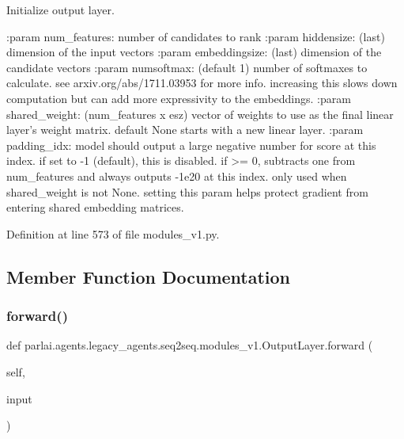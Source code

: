 \begin{DoxyVerb}Initialize output layer.

:param num_features:  number of candidates to rank
:param hiddensize:    (last) dimension of the input vectors
:param embeddingsize: (last) dimension of the candidate vectors
:param numsoftmax:   (default 1) number of softmaxes to calculate.
              see arxiv.org/abs/1711.03953 for more info.
              increasing this slows down computation but can
              add more expressivity to the embeddings.
:param shared_weight: (num_features x esz) vector of weights to use as
              the final linear layer's weight matrix. default
              None starts with a new linear layer.
:param padding_idx:   model should output a large negative number for
              score at this index. if set to -1 (default),
              this is disabled. if >= 0, subtracts one from
              num_features and always outputs -1e20 at this
              index. only used when shared_weight is not None.
              setting this param helps protect gradient from
              entering shared embedding matrices.
\end{DoxyVerb}
 

Definition at line 573 of file modules\+\_\+v1.\+py.



\subsection{Member Function Documentation}
\mbox{\label{classparlai_1_1agents_1_1legacy__agents_1_1seq2seq_1_1modules__v1_1_1OutputLayer_ad631d05ca77591036d35f3ce70a4fe4f}} 
\subsubsection{\texorpdfstring{forward()}{forward()}}
{\footnotesize\ttfamily def parlai.\+agents.\+legacy\+\_\+agents.\+seq2seq.\+modules\+\_\+v1.\+Output\+Layer.\+forward (\begin{DoxyParamCaption}\item[{}]{self,  }\item[{}]{input }\end{DoxyParamCaption})}

